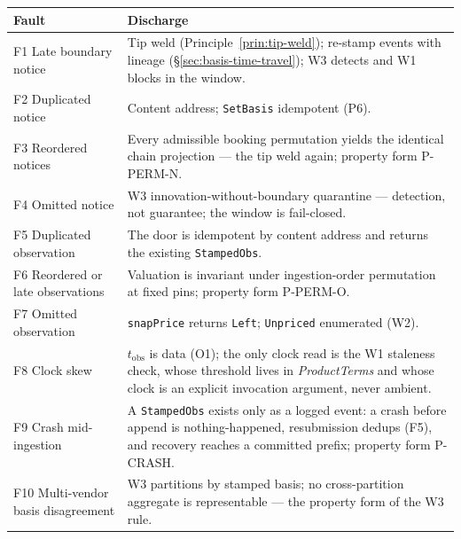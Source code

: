 \documentclass[11pt,a4paper]{article}
\begin{document}
\renewcommand{\arraystretch}{1.15}
\begin{center}
\begin{longtable}{@{}p{4.0cm} p{9.4cm}@{}}
\toprule
\textbf{Fault} & \textbf{Discharge} \\
\midrule
\endhead
F1 Late boundary notice & Tip weld (Principle~\ref{prin:tip-weld}); re-stamp events
with lineage (\S\ref{sec:basis-time-travel}); W3 detects and W1 blocks in the
window. \\
F2 Duplicated notice & Content address; \texttt{SetBasis} idempotent (P6). \\
F3 Reordered notices & Every admissible booking permutation yields the identical
chain projection --- the tip weld again; property form P-PERM-N. \\
F4 Omitted notice & W3 innovation-without-boundary quarantine --- detection, not
guarantee; the window is fail-closed. \\
F5 Duplicated observation & The door is idempotent by content address and returns
the existing \texttt{StampedObs}. \\
F6 Reordered or late observations & Valuation is invariant under ingestion-order
permutation at fixed pins; property form P-PERM-O. \\
F7 Omitted observation & \texttt{snapPrice} returns \texttt{Left};
\texttt{Unpriced} enumerated (W2). \\
F8 Clock skew & $t_{\mathrm{obs}}$ is data (O1); the only clock read is the W1
staleness check, whose threshold lives in \emph{ProductTerms} and whose clock is an
explicit invocation argument, never ambient. \\
F9 Crash mid-ingestion & A \texttt{StampedObs} exists only as a logged event: a
crash before append is nothing-happened, resubmission dedups (F5), and recovery
reaches a committed prefix; property form P-CRASH. \\
F10 Multi-vendor basis disagreement & W3 partitions by stamped basis; no
cross-partition aggregate is representable --- the property form of the W3 rule. \\
\bottomrule
\end{longtable}
\end{center}
\end{document}
